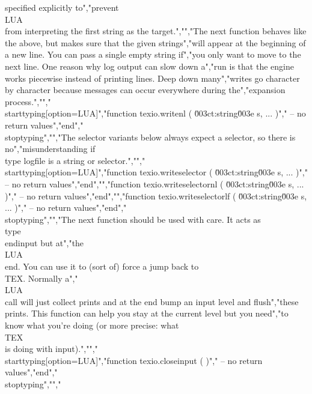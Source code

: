 specified explicitly to","prevent \\LUA\\ from interpreting the first string as the target.","","The next function behaves like the above, but makes sure that the given strings","will appear at the beginning of a new line. You can pass a single empty string if","you only want to move to the next line. One reason why log output can slow down a","run is that the engine works piecewise instead of printing lines. Deep down many","writes go character by character because messages can occur everywhere during the","expansion process.","","\\starttyping[option=LUA]","function texio.writenl ( \u003ct:string\u003e s, ... )","    -- no return values","end","\\stoptyping","","The selector variants below always expect a selector, so there is no","misunderstanding if \\type {logfile} is a string or selector.","","\\starttyping[option=LUA]","function texio.writeselector ( \u003ct:string\u003e s, ... )","    -- no return values","end","","function texio.writeselectornl ( \u003ct:string\u003e s, ... )","    -- no return values","end","","function texio.writeselectorlf ( \u003ct:string\u003e s, ... )","    -- no return values","end","\\stoptyping","","The next function should be used with care. It acts as \\type {\\endinput} but at","the \\LUA\\ end. You can use it to (sort of) force a jump back to \\TEX. Normally a","\\LUA\\ call will just collect prints and at the end bump an input level and flush","these prints. This function can help you stay at the current level but you need","to know what you're doing (or more precise: what \\TEX\\ is doing with input).","","\\starttyping[option=LUA]","function texio.closeinput ( )","    -- no return values","end","\\stoptyping","","%